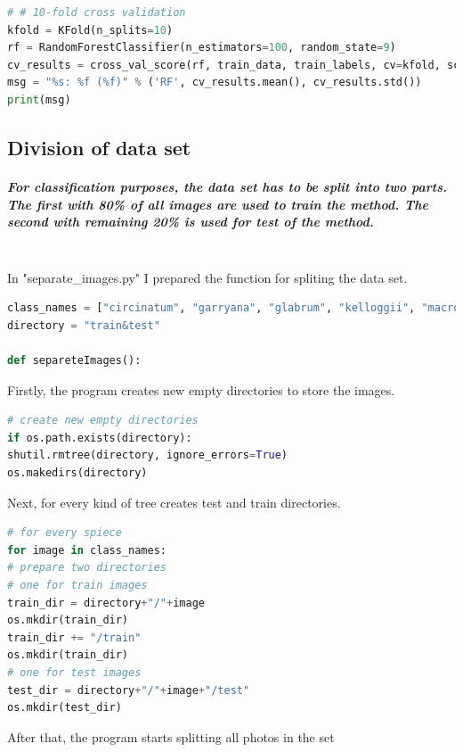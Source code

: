 \documentclass[12pt]{article}
\begin{document}
\begin{lstlisting}[language=Python]
# # 10-fold cross validation
kfold = KFold(n_splits=10)
rf = RandomForestClassifier(n_estimators=100, random_state=9)
cv_results = cross_val_score(rf, train_data, train_labels, cv=kfold, scoring="accuracy")
msg = "%s: %f (%f)" % ('RF', cv_results.mean(), cv_results.std())
print(msg)
\end{lstlisting}

\newpage

\subsection{Division of data set}

\subparagraph{
For classification purposes, the data set has to be split into two parts. The first with 80\% of all images are used to train the method. The second with remaining 20\% is used for test of the method. \\\\
}

In "separate\_images.py" I prepared the function for spliting the data set.

\begin{lstlisting}[language=Python]
class_names = ["circinatum", "garryana", "glabrum", "kelloggii", "macrophyllum","negundo"]
directory = "train&test"

def separeteImages():
\end{lstlisting}

Firstly, the program creates new empty directories to store the images.

\begin{lstlisting}[language=Python]
# create new empty directories
if os.path.exists(directory):
shutil.rmtree(directory, ignore_errors=True)
os.makedirs(directory)
\end{lstlisting}

Next, for every kind of tree creates test and train directories.

\begin{lstlisting}[language=Python]
# for every spiece
for image in class_names:
# prepare two directories
# one for train images
train_dir = directory+"/"+image
os.mkdir(train_dir)
train_dir += "/train"
os.mkdir(train_dir)
# one for test images
test_dir = directory+"/"+image+"/test"
os.mkdir(test_dir)
\end{lstlisting}

After that, the program starts splitting all photos in the set
\end{document}

